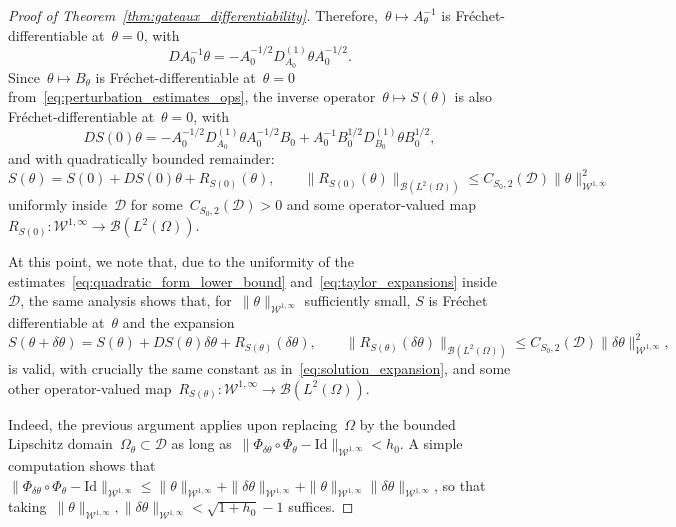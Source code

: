 \documentclass[a4]{article}
\newcommand{\1}{\mathbbm 1}
\newcommand{\Winf}{{{\cW}^{1,\infty}}}
\newcommand{\Id}{\mathrm{Id}}
\newcommand{\cW}{\mathcal{W}}
\begin{document}
\begin{proof}[Proof of Theorem~\ref{thm:gateaux_differentiability}]
    Therefore,~$\theta\mapsto A_\theta^{-1}$ is Fréchet-differentiable at~$\theta=0$, with
    \[D A_0^{-1}\theta = - A_0^{-1/2}D_{A_0}^{(1)}\theta A_0^{-1/2}.\]
    Since~$\theta\mapsto B_\theta$ is Fréchet-differentiable at~$\theta=0$ from~\eqref{eq:perturbation_estimates_ops}, the inverse operator~$\theta\mapsto S(\theta)$ is also Fréchet-differentiable at~$\theta=0$, with
    \begin{equation}
        \label{eq:derivative_solution_operator}
        D S(0)\theta = -A_0^{-1/2}D_{A_0}^{(1)}\theta A_0^{-1/2}B_0 + A_0^{-1}B_0^{1/2}D_{B_0}^{(1)}\theta B_0^{1/2},
    \end{equation}
    and with quadratically bounded remainder:
    \begin{equation}
        \label{eq:solution_expansion}
        S(\theta) = S(0) + D S(0)\theta + R_{S(0)}(\theta),\qquad \|R_{S(0)}(\theta)\|_{\mathcal B(L^2(\Omega))} \leq C_{S_0,2}(\mathcal D)\|\theta\|^2_{\Winf}
    \end{equation}
    uniformly inside~$\mathcal D$ for some~$C_{S_0,2}(\mathcal D)>0$ and some operator-valued map~$R_{S(0)}:\Winf\to\mathcal B(L^2(\Omega))$.

    At this point, we note that, due to the uniformity of the estimates~\eqref{eq:quadratic_form_lower_bound} and~\eqref{eq:taylor_expansions} inside~$\mathcal D$, the same analysis shows that, for~$\|\theta\|_{\Winf}$ sufficiently small,
    $S$ is Fréchet differentiable at~$\theta$ and the expansion
    \begin{equation}
        \label{eq:solution_expansion_nonzero}
        S(\theta+\delta\theta) = S(\theta) + D S(\theta)\delta\theta + R_{S(\theta)}(\delta\theta),\qquad \|R_{S(\theta)}(\delta\theta)\|_{\mathcal B(L^2(\Omega))} \leq C_{S_0,2}(\mathcal D)\|\delta\theta\|^2_{\Winf},
    \end{equation}
    is valid, with crucially the same constant as in~\eqref{eq:solution_expansion}, and some other operator-valued map~$R_{S(\theta)}:\Winf\to\mathcal B(L^2(\Omega))$.
    
    Indeed, the previous argument applies upon replacing~$\Omega$ by the bounded Lipschitz domain~$\Omega_\theta \subset \mathcal D$ as long as~$\|\Phi_{\delta\theta}\circ \Phi_\theta - \Id\|_{\Winf}<h_0$. A simple computation shows that~$\|\Phi_{\delta\theta}\circ \Phi_\theta - \Id\|_{\Winf}\leq \|\theta\|_{\Winf}+\|\delta\theta\|_{\Winf}+\|\theta\|_{\Winf}\|\delta\theta\|_{\Winf}$, so that taking~$\|\theta\|_{\Winf},\|\delta\theta\|_{\Winf}<\sqrt{1+h_0}-1$ suffices.


\end{proof}
\end{document}
